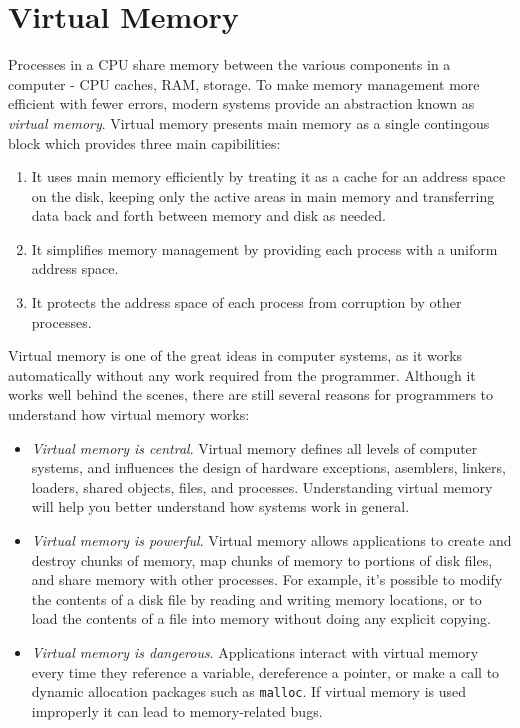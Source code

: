 \documentclass[../main.tex]{subfiles}
\begin{document}
\section{Virtual Memory}

Processes in a CPU share memory between the various components in a computer - CPU caches, RAM, storage. To make memory management more efficient with fewer errors, modern systems provide an abstraction known as \textit{virtual memory}. Virtual memory presents main memory as a single contingous block which provides three main capibilities:

\begin{enumerate}
    \item It uses main memory efficiently by treating it as a cache for an address space on the disk, keeping only the active areas in main memory and transferring data back and forth between memory and disk as needed.
    \item It simplifies memory management by providing each process with a uniform address space.
    \item It protects the address space of each process from corruption by other processes.
\end{enumerate}

Virtual memory is one of the great ideas in computer systems, as it works automatically without any work required from the programmer. Although it works well behind the scenes, there are still several reasons for programmers to understand how virtual memory works:

\begin{itemize}
    \item \textit{Virtual memory is central}. Virtual memory defines all levels of computer systems, and influences the design of hardware exceptions, asemblers, linkers, loaders, shared objects, files, and processes. Understanding virtual memory will help you better understand how systems work in general.
    \item \textit{Virtual memory is powerful}. Virtual memory allows applications to create and destroy chunks of memory, map chunks of memory to portions of disk files, and share memory with other processes. For example, it's possible to modify the contents of a disk file by reading and writing memory locations, or to load the contents of a file into memory without doing any explicit copying.
    \item \textit{Virtual memory is dangerous}. Applications interact with virtual memory every time they reference a variable, dereference a pointer, or make a call to dynamic allocation packages such as \lstinline{malloc}. If virtual memory is used improperly it can lead to memory-related bugs.
\end{itemize}
\end{document}
